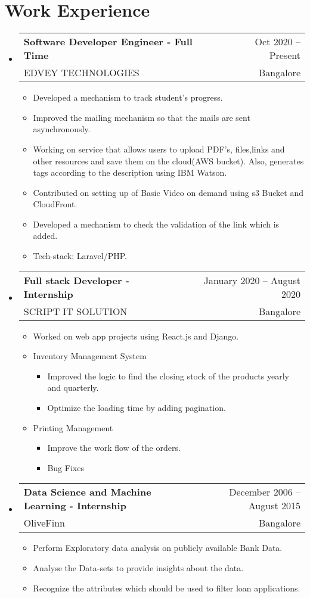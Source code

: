\documentclass[A4,11pt]{article}
\makeatletter
\newcommand{\CVItem}[1]{
  \item\small{
    {#1 \vspace{-2pt}}
  }
}
\newcommand{\CVSubheading}[4]{
  \vspace{-2pt}\item
    \begin{tabular*}{0.97\textwidth}[t]{l@{\extracolsep{\fill}}r}
      \textbf{#1} & #2 \\
      \small#3 & \small #4 \\
    \end{tabular*}\vspace{-7pt}
}
\newcommand{\CVSubHeadingListStart}{\begin{itemize}[leftmargin=0.5cm, label={}]}
\newcommand{\CVSubHeadingListEnd}{\end{itemize}}
\newcommand{\CVItemListStart}{\begin{itemize}}
\newcommand{\CVItemListEnd}{\end{itemize}\vspace{-5pt}}
\makeatother
\begin{document}
 
\section{Work Experience}
  \CVSubHeadingListStart
    \CVSubheading
      {Software Developer Engineer - Full Time}{Oct 2020 -- Present}
      {EDVEY TECHNOLOGIES}{Bangalore}
      
      
      \CVItemListStart
        \CVItem{Developed a mechanism to track student's progress.}
        \CVItem{Improved the mailing mechanism so that the mails are sent asynchronously.}
        \CVItem{Working on service that allows users to upload PDF's, files,links and other resources and save them on the cloud(AWS bucket). Also, generates tags according to the description using IBM Watson. }
        \CVItem{Contributed on setting up of Basic Video on demand using s3 Bucket and CloudFront.}
        \CVItem{Developed a mechanism to check the validation of the link which is added.}
        \CVItem{Tech-stack: Laravel/PHP.}
      \CVItemListEnd
    \CVSubheading
      {Full stack Developer - Internship}{January 2020 -- August 2020}
      {SCRIPT IT SOLUTION}{Bangalore}
      \CVItemListStart
        \CVItem{Worked on web app projects using React.js and Django.}
        \CVItem {Inventory Management System}
                \CVItemListStart
                \CVItem{Improved the logic to find the closing stock of the products yearly and quarterly.}
                \CVItem{Optimize the loading time by adding pagination.}
                \CVItemListEnd
        \CVItem{Printing Management}
        \CVItemListStart
                \CVItem{Improve the work flow of the orders.}
                \CVItem{Bug Fixes}
        \CVItemListEnd
    \CVItemListEnd
    \CVSubheading
      {Data Science and Machine Learning - Internship}{December 2006 -- August 2015}
      {OliveFinn}{Bangalore}
      \CVItemListStart
        \CVItem{Perform Exploratory data analysis on publicly available Bank Data.}
        \CVItem{Analyse the Data-sets to provide insights about the data.}
        \CVItem{Recognize the attributes which should be used to filter loan applications.}
      \CVItemListEnd
  \CVSubHeadingListEnd
\begin{comment}
This section is compressed from the various skills sections that Euro CV
recommends.
\end{comment}
\end{document}
